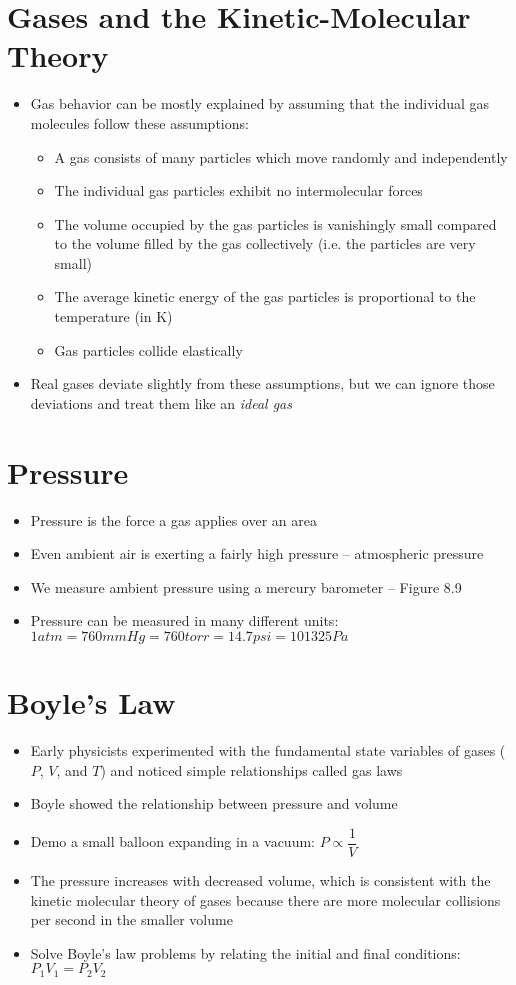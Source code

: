 \documentclass[12pt, openany, letterpaper]{memoir}
\begin{document}
\section{Gases and the Kinetic-Molecular Theory}
\begin{itemize}
	\item Gas behavior can be mostly explained by assuming that the individual gas molecules follow these assumptions:
	      \begin{itemize}
		      \item A gas consists of many particles which move randomly and independently
		      \item The individual gas particles exhibit no intermolecular forces
		      \item The volume occupied by the gas particles is vanishingly small compared to the volume filled by the gas collectively (i.e. the particles are very small)
		      \item The average kinetic energy of the gas particles is proportional to the temperature (in K)
		      \item Gas particles collide elastically
	      \end{itemize}
	\item Real gases deviate slightly from these assumptions, but we can ignore those deviations and treat them like an \emph{ideal gas}
\end{itemize}
\section{Pressure}
\begin{itemize}
	\item Pressure is the force a gas applies over an area
	\item Even ambient air is exerting a fairly high pressure -- atmospheric pressure
	\item We measure ambient pressure using a mercury barometer -- Figure 8.9
	\item Pressure can be measured in many different units: $1atm=760mmHg=760torr=14.7psi=101325Pa$
\end{itemize}
\section{Boyle's Law}
\begin{itemize}
	\item Early physicists experimented with the fundamental state variables of gases ($P$, $V$, and $T$) and noticed simple relationships called gas laws
	\item Boyle showed the relationship between pressure and volume
	\item Demo a small balloon expanding in a vacuum: $P\propto \dfrac{1}{V}$
	\item The pressure increases with decreased volume, which is consistent with the kinetic molecular theory of gases because there are more molecular collisions per second in the smaller volume
	\item Solve Boyle's law problems by relating the initial and final conditions: $P_1V_1=P_2V_2$
\end{itemize}
\end{document}
